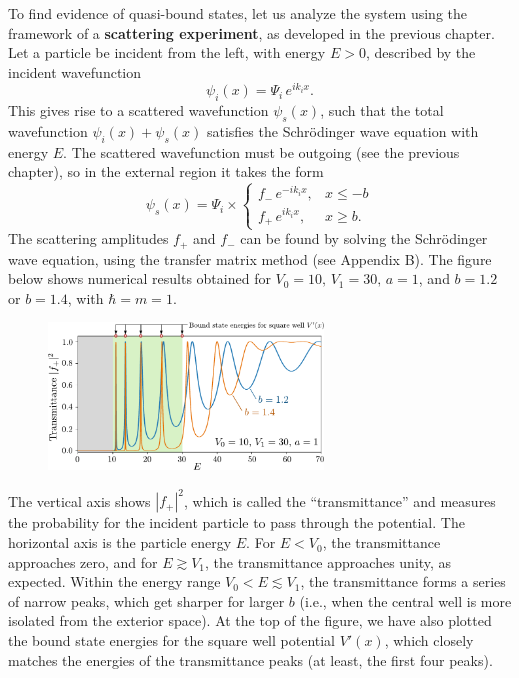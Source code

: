 \documentclass[pra,12pt]{revtex4}
\begin{document}
To find evidence of quasi-bound states, let us analyze the system
using the framework of a \textbf{scattering experiment}, as developed
in the previous chapter.  Let a particle be incident from the left,
with energy $E > 0$, described by the incident wavefunction
$$\psi_i(x) = \Psi_i \, e^{ik_i x}.$$
This gives rise to a scattered wavefunction $\psi_s(x)$, such that the
total wavefunction $\psi_i(x) + \psi_s(x)$ satisfies the Schr\"odinger
wave equation with energy $E$.  The scattered wavefunction must be
outgoing (see the previous chapter), so in the external region it
takes the form
$$\psi_s(x) = \Psi_i \times \begin{cases}f_- \,e^{-ik_ix}, & x \le -b \\ f_+ \,e^{ik_ix}, & x \ge b.\end{cases}$$
The scattering amplitudes $f_+$ and $f_-$ can be found by solving the
Schr\"odinger wave equation, using the transfer matrix method (see
Appendix B).  The figure below shows numerical results obtained for
$V_0 = 10,\,V_1 = 30,\,a=1$, and $b = 1.2$ or $b = 1.4$, with $\hbar =
m = 1$.

\begin{figure}[h]
  \centering\includegraphics[width=0.65\textwidth]{resonances}
\end{figure}

The vertical axis shows $|f_+|^2$, which is called the
``transmittance'' and measures the probability for the incident
particle to pass through the potential.  The horizontal axis is the
particle energy $E$.  For $E < V_0$, the transmittance approaches
zero, and for $E \gtrsim V_1$, the transmittance approaches unity, as
expected.  Within the energy range $V_0 < E \lesssim V_1$, the
transmittance forms a series of narrow peaks, which get sharper for
larger $b$ (i.e., when the central well is more isolated from the
exterior space).  At the top of the figure, we have also plotted the
bound state energies for the square well potential $V'(x)$, which
closely matches the energies of the transmittance peaks (at least, the
first four peaks).
\end{document}
